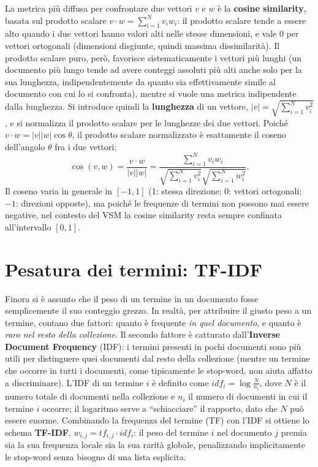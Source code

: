 \documentclass[11pt,a4paper]{report}
\begin{document}
La metrica più diffusa per confrontare due vettori $v$ e $w$ è la \textbf{cosine similarity}, basata sul prodotto scalare $v \cdot w = \sum_{i=1}^N v_i w_i$: il prodotto scalare tende a essere alto quando i due vettori hanno valori alti nelle stesse dimensioni, e vale 0 per vettori ortogonali (dimensioni disgiunte, quindi massima dissimilarità). Il prodotto scalare puro, però, favorisce sistematicamente i vettori più lunghi (un documento più lungo tende ad avere conteggi assoluti più alti anche solo per la sua lunghezza, indipendentemente da quanto sia effettivamente simile al documento con cui lo si confronta), mentre si vuole una metrica indipendente dalla lunghezza. Si introduce quindi la \textbf{lunghezza} di un vettore, $|v| = \sqrt{\sum_{i=1}^N v_i^2}$, e si normalizza il prodotto scalare per le lunghezze dei due vettori. Poiché $v \cdot w = |v||w|\cos\theta$, il prodotto scalare normalizzato è esattamente il coseno dell'angolo $\theta$ fra i due vettori:
\[
\cos(v,w) = \frac{v\cdot w}{|v||w|} = \frac{\sum_{i=1}^N v_i w_i}{\sqrt{\sum_{i=1}^N v_i^2}\sqrt{\sum_{i=1}^N w_i^2}}.
\]
Il coseno varia in generale in $[-1,1]$ (1: stessa direzione; 0: vettori ortogonali; $-1$: direzioni opposte), ma poiché le frequenze di termini non possono mai essere negative, nel contesto del VSM la cosine similarity resta sempre confinata all'intervallo $[0,1]$.

\section{Pesatura dei termini: TF-IDF}

Finora si è assunto che il peso di un termine in un documento fosse semplicemente il suo conteggio grezzo. In realtà, per attribuire il giusto peso a un termine, contano due fattori: quanto è frequente \emph{in quel documento}, e quanto è \emph{raro nel resto della collezione}. Il secondo fattore è catturato dall'\textbf{Inverse Document Frequency} (IDF): i termini presenti in pochi documenti sono più utili per distinguere quei documenti dal resto della collezione (mentre un termine che occorre in tutti i documenti, come tipicamente le stop-word, non aiuta affatto a discriminare). L'IDF di un termine $i$ è definito come $idf_i = \log\frac{N}{n_i}$, dove $N$ è il numero totale di documenti nella collezione e $n_i$ il numero di documenti in cui il termine $i$ occorre; il logaritmo serve a ``schiacciare'' il rapporto, dato che $N$ può essere enorme. Combinando la frequenza del termine (TF) con l'IDF si ottiene lo schema \textbf{TF-IDF}, $w_{i,j} = tf_{i,j} \cdot idf_i$: il peso del termine $i$ nel documento $j$ premia sia la sua frequenza locale sia la sua rarità globale, penalizzando implicitamente le stop-word senza bisogno di una lista esplicita.
\end{document}
